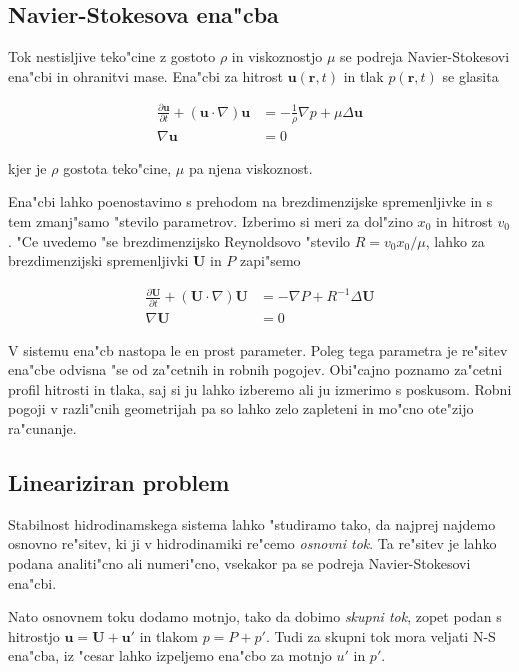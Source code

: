 \documentclass[a4paper,12pt]{article}
\renewcommand{\vec}{\mathbf}
\newcommand{\rt}{(\vec r, t)}
\begin{document}
\subsection{Navier-Stokesova ena"cba}

Tok nestisljive teko"cine z gostoto $\rho$ in viskoznostjo $\mu$ se podreja Navier-Stokesovi ena"cbi in ohranitvi mase. Ena"cbi za hitrost $\vec u\rt$ in tlak $p\rt$ se glasita

\begin{align}
 \label{eq:ns-enacba}
\frac{\partial \vec u}{\partial t} + (\vec u \cdot \nabla) \vec u &= -\frac{1}{\rho}\nabla p + \mu \Delta \vec u \\
\nabla \vec u &= 0
\end{align}

kjer je $\rho$ gostota teko"cine, $\mu$ pa njena viskoznost. 

Ena"cbi lahko poenostavimo s prehodom na brezdimenzijske spremenljivke in s tem zmanj"samo "stevilo parametrov. Izberimo si meri za dol"zino $x_0$ in hitrost $v_0$. "Ce uvedemo "se brezdimenzijsko Reynoldsovo "stevilo $R=v_0 x_0 / \mu$, lahko za brezdimenzijski spremenljivki $\vec U$ in $P$ zapi"semo

\begin{align}
 \label{eq:ns-brezdim}
\frac{\partial \vec U}{\partial t} + (\vec U \cdot \nabla) \vec U &= -\nabla P + R^{-1} \Delta \vec U \\
\nabla \vec U &= 0
\end{align}

V sistemu ena"cb nastopa le en prost parameter. Poleg tega parametra je re"sitev ena"cbe odvisna "se od za"cetnih in robnih pogojev. Obi"cajno poznamo za"cetni profil hitrosti in tlaka, saj si ju lahko izberemo ali ju izmerimo s poskusom. Robni pogoji v razli"cnih geometrijah pa so lahko zelo zapleteni in mo"cno ote"zijo ra"cunanje. 

\subsection{Lineariziran problem}

Stabilnost hidrodinamskega sistema lahko "studiramo tako, da najprej najdemo osnovno re"sitev, ki ji v hidrodinamiki re"cemo \emph{osnovni tok}. Ta re"sitev je lahko podana analiti"cno ali numeri"cno, vsekakor pa se podreja Navier-Stokesovi ena"cbi. 

Nato osnovnem toku dodamo motnjo, tako da dobimo \emph{skupni tok}, zopet podan s hitrostjo $\vec u = \vec U + \vec u'$ in tlakom $p = P + p'$. Tudi za skupni tok mora veljati N-S ena"cba, iz "cesar lahko izpeljemo ena"cbo za motnjo $u'$ in $p'$. 
\end{document}

